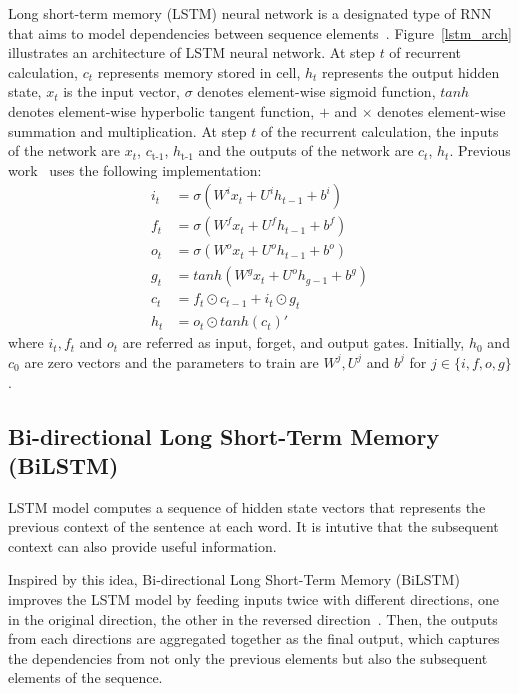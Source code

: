 Long short-term memory (LSTM) neural network is a designated type of RNN that aims to model dependencies between sequence elements~\citep{lstm1997}. Figure~\ref{lstm_arch} illustrates an architecture of LSTM neural network. At step $t$ of recurrent calculation, $c_t$ represents memory stored in cell, $h_t$ represents the output hidden state, $x_t$ is the input vector, $\sigma$ denotes element-wise sigmoid function, $tanh$ denotes element-wise hyperbolic tangent function, $+$ and $\times$ denotes element-wise summation and multiplication.  At step $t$ of the recurrent calculation, the inputs of the network are $x_t$, $c_\text{t-1}$, $h_\text{t-1}$ and the outputs of the network are $c_t$, $h_t$. Previous work~\citep{wang2018cross} uses the following implementation:
\begin{align*} 
i_t &= \sigma(W^ix_t + U^ih_{t-1} + b^i)\\
f_t &= \sigma(W^fx_t + U^fh_{t-1} + b^f)\\
o_t &= \sigma(W^ox_t + U^oh_{t-1} + b^o)\\
g_t &= tanh(W^gx_t + U^oh_{g-1} + b^g)\\
c_t &= f_t \odot c_{t-1} + i_t \odot g_t \\
h_t &= o_t \odot tanh(c_t)'
\end{align*}
where $i_t, f_t$ and $o_t$ are referred as input, forget, and output gates. Initially, $h_0$ and $c_0$ are zero vectors and the parameters to train are $W^j, U^j$ and $b^j$ for $j\in\{i,f,o,g\}$.

\subsection{Bi-directional Long Short-Term Memory (BiLSTM)}
LSTM model computes a sequence of hidden state vectors that represents the previous context of the sentence at each word. It is intutive that the subsequent context can also provide useful information.

Inspired by this idea, Bi-directional Long Short-Term Memory (BiLSTM) improves the LSTM model by feeding inputs twice with different directions, one in the original direction, the other in the reversed direction~\citep{bilstm}. Then, the outputs from each directions are aggregated together as the final output, which captures the dependencies from not only the previous elements but also the subsequent elements of the sequence.


